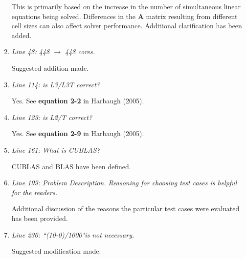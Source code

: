 \documentclass[12pt]{article} %
\begin{document}
\begin{enumerate}
This is primarily based on the increase in the number of simultaneous linear equations being solved. Differences in the \textbf{A} matrix resulting from different cell sizes can also affect solver performance. Additional clarification has been added. 

\item \textit{Line 48: 448 $\rightarrow$ 448 cores. } 

Suggested addition made.

\item \textit{Line 114: is L3/L3T correct? } 

Yes. See \textbf{equation 2-2} in Harbaugh (2005).

\item \textit{Line 123: is L2/T correct? } 

Yes. See \textbf{equation 2-9} in Harbaugh (2005).

\item \textit{Line 161: What is CUBLAS? } 

CUBLAS and BLAS have been defined.

\item \textit{Line 199: Problem Description. Reasoning for choosing test cases is helpful for the readers. } 

Additional discussion of the reasons the particular test cases were evaluated has been provided.

\item \textit{Line 236: ``(10-0)/1000"is not necessary.} 

Suggested modification made.

\end{enumerate}
\end{document}
